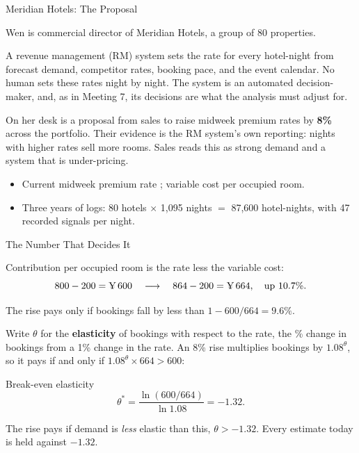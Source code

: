 \documentclass[aspectratio=169, 11pt, handout]{beamer}
\begin{document}
\begin{frame}{Meridian Hotels: The Proposal}

Wen is commercial director of Meridian Hotels, a group of 80 properties.

\bigskip

A revenue management (RM) system sets the rate for every hotel-night from forecast demand, competitor rates, booking pace, and the event calendar. No human sets these rates night by night. The system is an automated decision-maker, and, as in Meeting 7, its decisions are what the analysis must adjust for.

\bigskip

On her desk is a proposal from sales to raise midweek premium rates by \textbf{8\%} across the portfolio. Their evidence is the RM system's own reporting: nights with higher rates sell more rooms. Sales reads this as strong demand and a system that is under-pricing.

\bigskip

\begin{itemize}
  \item Current midweek premium rate ; variable cost  per occupied room.
  \item Three years of logs: 80 hotels $\times$ 1{,}095 nights $=$ 87{,}600 hotel-nights, with 47 recorded signals per night.
\end{itemize}
\end{frame}

\begin{frame}{The Number That Decides It}

Contribution per occupied room is the rate less the variable cost:
\[
800 - 200 = \text{\textyen}\,600 \quad\longrightarrow\quad 864 - 200 = \text{\textyen}\,664, \quad \text{up } 10.7\%.
\]

The rise pays only if bookings fall by less than $1 - 600/664 = 9.6\%$.

\bigskip

Write $\theta$ for the \textbf{elasticity} of bookings with respect to the rate, the \% change in bookings from a 1\% change in the rate. An 8\% rise multiplies bookings by $1.08^{\theta}$, so it pays if and only if $1.08^{\theta} \times 664 > 600$:

\begin{alertblock}{Break-even elasticity}
\[
\theta^{\ast} = \frac{\ln(600/664)}{\ln 1.08} = -1.32 .
\]
\end{alertblock}

\medskip

The rise pays if demand is \emph{less} elastic than this, $\theta > -1.32$. Every estimate today is held against $-1.32$.
\end{frame}
\end{document}
